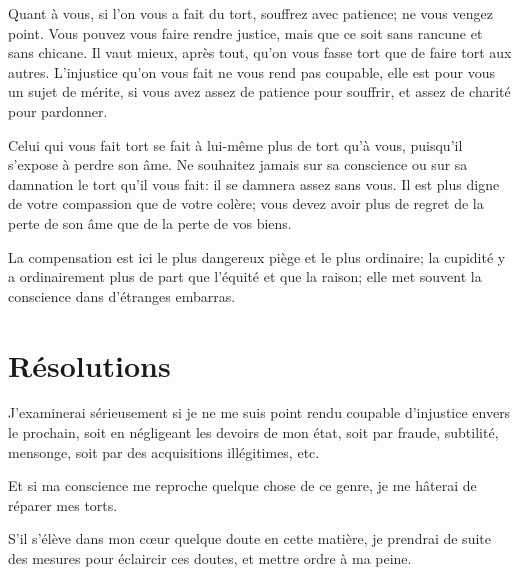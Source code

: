 \documentclass[instructions.tex]{subfiles}
\begin{document}
\secundo Quant à vous, si l’on vous a fait du tort, souffrez avec patience; ne vous vengez point. Vous pouvez vous faire rendre justice, mais que ce soit sans rancune et sans chicane. Il vaut mieux, après tout, qu’on vous fasse tort que de faire tort aux autres. L’injustice qu’on vous fait ne vous rend pas coupable, elle est pour vous un sujet de mérite, si vous avez assez de patience pour souffrir, et assez de charité pour pardonner.
 
Celui qui vous fait tort se fait à lui-même plus de tort qu’à vous, puisqu’il s’expose à perdre son âme. Ne souhaitez jamais sur sa conscience ou sur sa damnation le tort qu’il vous fait: il se damnera assez sans vous. Il est plus digne de votre compassion que de votre colère; vous devez avoir plus de regret de la perte de son âme que de la perte de vos biens.
 
La compensation est ici le plus dangereux piège et le plus ordinaire; la cupidité y a ordinairement plus de part que l’équité et que la raison; elle met souvent la conscience dans d’étranges embarras.
 
\section{Résolutions}
 
\primo J’examinerai sérieusement si je ne me suis point rendu coupable d’injustice envers le prochain, soit en négligeant les devoirs de mon état, soit par fraude, subtilité, mensonge, soit par des acquisitions illégitimes, etc.

\secundo Et si ma conscience me reproche quelque chose de ce genre, je me hâterai de réparer mes torts.

\tertio S’il s’élève dans mon cœur quelque doute en cette matière, je prendrai de suite des mesures pour éclaircir ces doutes, et mettre ordre à ma peine. 

 
\end{document}
